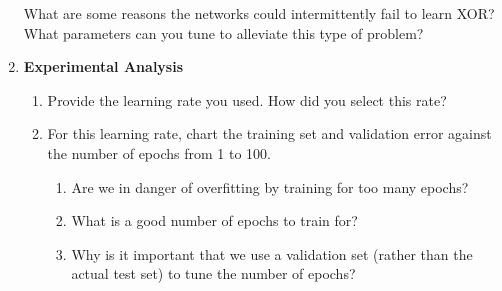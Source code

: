 \documentclass{article}
\newcommand{\edit}[1]{\colorbox{Yellow}{#1}}
\begin{document}
\begin{enumerate}





    What are some reasons the networks could intermittently fail to learn XOR?
    What parameters can you tune to alleviate this type of problem?



  \item \textbf{Experimental Analysis}
    \begin{enumerate}
    \item Provide the learning rate you used. How did you select this rate?

    \item For this learning rate, chart the training set and validation error
      against the number of epochs from 1 to 100. 

      \begin{enumerate}
      \item Are we in danger of overfitting by training for too many epochs?


      \item What is a good number of epochs to train for?


      \item Why is it important that we use a validation set (rather than the
        actual test set) to tune the number of epochs?


\end{enumerate}
\end{enumerate}
\end{enumerate}
\end{document}
